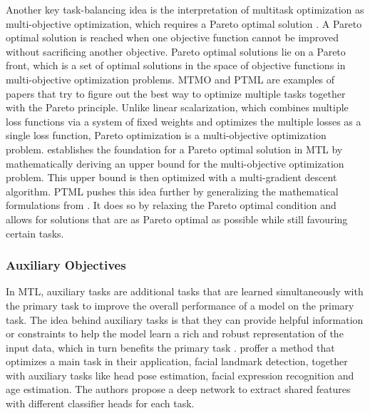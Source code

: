 Another key task-balancing idea is the interpretation of multitask optimization as multi-objective optimization, which requires a Pareto optimal solution \citep{MTMO_koltun,lin2019pareto}.
A Pareto optimal solution is reached when one objective function cannot be improved without sacrificing another objective. Pareto optimal solutions lie on a Pareto front, which is a set of optimal solutions in the space of objective functions in multi-objective optimization problems.  MTMO \citep{MTMO_koltun} and PTML \citep{lin2019pareto} are examples of papers that try to figure out the best way to optimize multiple tasks together with the Pareto principle. 
Unlike linear scalarization, which combines multiple loss functions via a system of fixed weights and optimizes the multiple losses as a single loss function, Pareto optimization is a multi-objective optimization problem.
\citet{MTMO_koltun} establishes the foundation for a Pareto optimal solution in MTL by mathematically deriving an upper bound for the multi-objective optimization problem.
This upper bound is then optimized with a multi-gradient descent algorithm. 
PTML pushes this idea further by generalizing the mathematical formulations from \citet{MTMO_koltun}. It does so by relaxing the Pareto optimal condition and allows for solutions that are as Pareto optimal as possible while still favouring certain tasks.



\subsubsection{Auxiliary Objectives} \label{sec::multitask_learning_natural_images::auxiliary_tasks}
In MTL, auxiliary tasks are additional tasks that are learned simultaneously with the primary task to improve the overall performance of a model on the primary task. The idea behind auxiliary tasks is that they can provide helpful information or constraints to help the model learn a rich and robust representation of the input data, which in turn benefits the primary task \citep{liebel2018auxiliary}.
\citet{zhang2014facial} proffer a method that optimizes a main task in their application, facial landmark detection, together with auxiliary tasks like head pose estimation, facial expression recognition and age estimation. The authors propose a deep network to extract shared features with different classifier heads for each task. 


